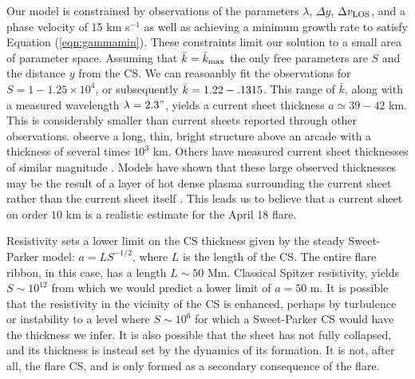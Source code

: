 

Our model is constrained by observations of the parameters $\lambda$, $\Delta y$, $\Delta v_{\rm LOS}$, and a phase velocity of 15 km s$^{-1}$ as well as achieving a minimum growth rate to satisfy Equation (\ref{eqn:gammamin}). These constraints limit our solution to a small area of parameter space. Assuming that $\bar{k} = \bar{k}_{\rm max}$ the only free parameters are $S$ and the distance $y$ from the CS. We can reasoanbly fit the observations for $S= 1-1.25 \times 10^4$, or subsequently $\bar{k} = 1.22-.1315$. This range of $\bar{k}$, along with a measured wavelength $\lambda = 2.3"$, yields a current sheet thickness $a \simeq 39 - 42$ km. This is considerably smaller than current sheets reported through other observations. \citet{Savage2010} observe a long, thin, bright structure above an arcade with a thickness of several times $10^3$ km. Others have measured current sheet thicknesses of similar magnitude \citep{Seaton2016}. Models have shown that these large observed thicknesses may be the result of a layer of hot dense plasma surrounding the current sheet rather than the current sheet itself \citep{Seaton2009,Reeves2010,Yokoyama1998}. This leads us to believe that a current sheet on order $10$ km is a realistic estimate for the April 18 flare.

Resistivity sets a lower limit on the CS thickness given by the steady Sweet-Parker model: $a=LS^{-1/2}$, where $L$ is the length of the CS.  The entire flare ribbon, in this case, has a length $L\sim 50$ Mm.  Classical Spitzer resistivity, yields $S\sim 10^{12}$ from which we would predict a lower limit of $a=50$ m.  It is possible that the resistivity in the vicinity of the CS is enhanced, perhaps by turbulence or instability \citep{Strauss1986} to a level where $S\sim 10^6$ for which a Sweet-Parker CS would have the thickness we infer.  It is also possible that the sheet has not fully collapsed, and its thickness is instead set by the dynamics of its formation.  It is not, after all, the flare CS, and is only formed as a secondary consequence of the flare.


